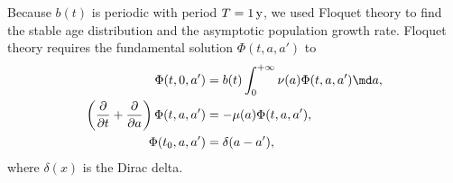 \documentclass{jpmarticle}
\begin{document}
Because $b(t)$ is periodic with period $T = \unit[1]{y}$, we used
Floquet theory \autocite{parker_1992} to find the stable age
distribution and the asymptotic population growth rate. Floquet theory
requires the fundamental solution $\Phi(t, a, a')$ to
\begin{equation}
  \begin{split}
    \Phi(t, 0, a')
    &= b(t) \int_0^{+\infty} \nu(a) \Phi(t, a, a') \md a,
    \\
    \left(\frac{\partial}{\partial t}
      + \frac{\partial}{\partial a}\right)
    \Phi(t, a, a')
    &= - \mu(a) \Phi(t, a, a'),
    \\
    \Phi(t_0, a, a')
    &= \delta(a - a'),
  \end{split}
\end{equation}
where $\delta(x)$ is the Dirac delta.
\end{document}
